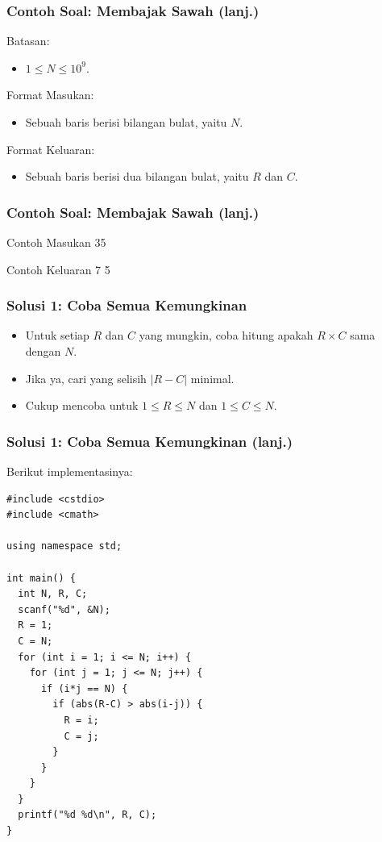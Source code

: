 \begin{frame}
\frametitle{Contoh Soal: Membajak Sawah (lanj.)}
Batasan:
\begin{itemize}
  \item $1 \le N \le 10^9$.
\end{itemize}

\hfill

Format Masukan:
\begin{itemize}
  \item Sebuah baris berisi bilangan bulat, yaitu $N$.
\end{itemize}

\hfill

Format Keluaran:
\begin{itemize}
  \item Sebuah baris berisi dua bilangan bulat, yaitu $R$ dan $C$.
\end{itemize}

\end{frame}

\begin{frame}
\frametitle{Contoh Soal: Membajak Sawah (lanj.)}

\begin{block}{Contoh Masukan}
35
\end{block}

\hfill

\begin{block}{Contoh Keluaran}
7 5
\end{block}

\end{frame}

\begin{frame}
\frametitle{Solusi 1: Coba Semua Kemungkinan}
\begin{itemize}
  \item Untuk setiap $R$ dan $C$ yang mungkin, coba hitung apakah $R \times C$ sama dengan $N$.
  \item Jika ya, cari yang selisih $|R-C|$ minimal.
  \item Cukup mencoba untuk $1 \le R \le N$ dan $1 \le C \le N$.
\end{itemize}
\end{frame}

\begin{frame}[fragile]
\frametitle{Solusi 1: Coba Semua Kemungkinan (lanj.)}
Berikut implementasinya:
\begin{lstlisting}
#include <cstdio>
#include <cmath>

using namespace std;

int main() {
  int N, R, C;
  scanf("%d", &N);
  R = 1;
  C = N;
  for (int i = 1; i <= N; i++) {
    for (int j = 1; j <= N; j++) {
      if (i*j == N) {
        if (abs(R-C) > abs(i-j)) {
          R = i;
          C = j;
        }
      }
    }
  }
  printf("%d %d\n", R, C);
}
\end{lstlisting}
\end{frame}

